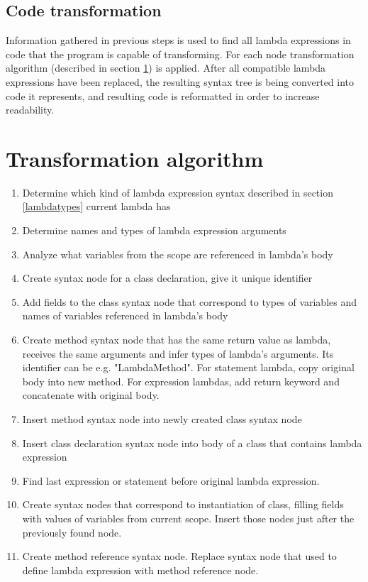 \documentclass[]{report}
\begin{document}
    \subsection{Code transformation}
    
    Information gathered in previous steps is used to find all lambda expressions in code that the program is capable of transforming. For each node transformation algorithm (described in section \ref{transalgorithm}) is applied.
    After all compatible lambda expressions have been replaced, the resulting syntax tree is being converted into code it represents, and resulting code is reformatted in order to increase readability.
    
    \section{Transformation algorithm}\label{transalgorithm}
    \begin{enumerate}
      \item {Determine which kind of lambda expression syntax described in section  \ref{lambdatypes} current lambda has}
   \item Determine names and types of lambda expression arguments
   \item Analyze what variables from the scope are referenced in lambda's body
   \item Create syntax node for a class declaration, give it unique identifier
   \item Add fields to the class syntax node that correspond to types of variables and names of variables referenced in lambda's body
   \item Create method syntax node that has the same return value as lambda, receives the same arguments and infer types of lambda's arguments. Its identifier can be e.g. "LambdaMethod". For statement lambda, copy original body into new method. For expression lambdas, add return keyword and concatenate with original body.
   \item Insert method syntax node into newly created class syntax node
   \item Insert class declaration syntax node into body of a class that contains lambda expression
   \item Find last expression or statement before original lambda expression.
   \item Create syntax nodes that correspond to instantiation of class, filling fields with values of variables from current scope. Insert those nodes just after the previously found node.
    \item Create method reference syntax node. Replace syntax node that used to define lambda expression with method reference node.
    \end{enumerate}
    
\end{document}
